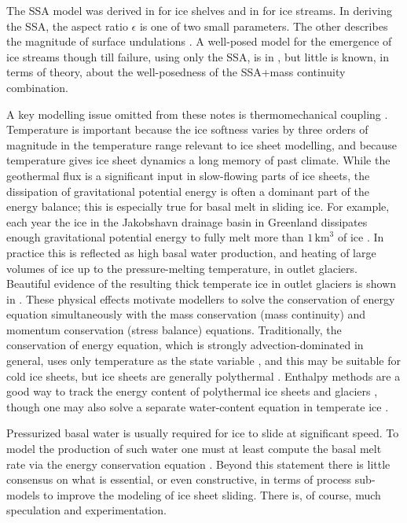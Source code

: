 \documentclass[letterpaper,final,12pt,reqno]{amsart}
\newcommand{\eps}{\epsilon}
\begin{document}
The SSA model \cite{WeisGreveHutter} was derived in \cite{Morland} for ice shelves and in \cite{MacAyeal} for ice streams.  In deriving the SSA, the aspect ratio $\eps$ is one of two small parameters.  The other describes the magnitude of surface undulations \cite{SchoofStream,SchoofHindmarsh}.  A well-posed model for the emergence of ice streams though till failure, using only the SSA, is in \cite{SchoofStream}, but little is known, in terms of theory, about the well-posedness of the SSA+mass continuity combination.

A key modelling issue omitted from these notes is thermomechanical coupling \cite{Blatteretal2010}.  Temperature is important because the ice softness varies by three orders of magnitude in the temperature range relevant to ice sheet modelling, and because temperature gives ice sheet dynamics a long memory of past climate.  While the geothermal flux is a significant input in slow-flowing parts of ice sheets, the dissipation of gravitational potential energy is often a dominant part of the energy balance; this is especially true for basal melt in sliding ice.  For example, each year the ice in the Jakobshavn drainage basin in Greenland dissipates enough gravitational potential energy to fully melt more than $1\,\text{km}^3$ of ice \cite{AschwandenBuelerKhroulevBlatter}.  In practice this is reflected as high basal water production, and heating of large volumes of ice up to the pressure-melting temperature, in outlet glaciers.  Beautiful evidence of the resulting thick temperate ice in outlet glaciers is shown in \cite{Luethietal2009}.  These physical effects motivate modellers to solve the conservation of energy equation simultaneously with the mass conservation (mass continuity) and momentum conservation (stress balance) equations.  Traditionally, the conservation of energy equation, which is strongly advection-dominated in general, uses only temperature as the state variable \cite{BBL}, and this may be suitable for cold ice sheets, but ice sheets are generally polythermal \cite{FowlerLarson1978,Greve}.  Enthalpy methods are a good way to track the energy content of polythermal ice sheets and glaciers \cite{AschwandenBuelerKhroulevBlatter,GreveBlatter2016}, though one may also solve a separate water-content equation in temperate ice \cite{Greve}.

Pressurized basal water is usually required for ice to slide at significant speed.  To model the production of such water one must at least compute the basal melt rate via the energy conservation equation \cite{BBssasliding,BuelervanPelt2015,Clarke05,Raymondenergy,Tulaczyketal2000b}.  Beyond this statement there is little consensus on what is essential, or even constructive, in terms of process sub-models to improve the modeling of ice sheet sliding.  There is, of course, much speculation and experimentation.
\end{document}
